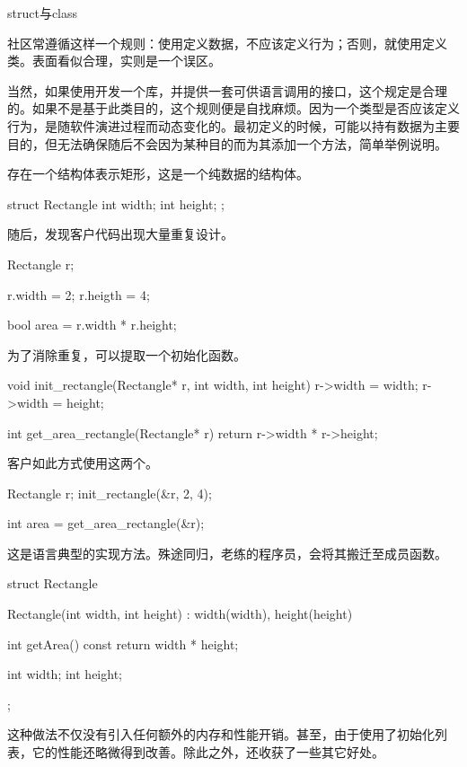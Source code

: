 \begin{content}
\begin{episode}{struct与class}
\begin{content}
社区常遵循这样一个规则：使用定义数据，不应该定义行为；否则，就使用定义类。表面看似合理，实则是一个误区。

当然，如果使用\cpp{}开发一个库，并提供一套可供\clang{}语言调用的接口，这个规定是合理的。如果不是基于此类目的，这个规则便是自找麻烦。因为一个类型是否应该定义行为，是随软件演进过程而动态变化的。最初定义的时候，可能以持有数据为主要目的，但无法确保随后不会因为某种目的而为其添加一个方法，简单举例说明。

存在一个结构体表示矩形，这是一个纯数据的结构体。

\begin{c++}
struct Rectangle {
  int width;
  int height;
};
\end{c++}

随后，发现客户代码出现大量重复设计。

\begin{c++}
Rectangle r;

r.width = 2;
r.heigth = 4;

bool area = r.width * r.height;
\end{c++}

为了消除重复，可以提取一个初始化函数。

\begin{c++}
void init_rectangle(Rectangle* r, int width, int height) {
  r->width = width;
  r->width = height;
}

int get_area_rectangle(Rectangle* r) {
  return r->width * r->height;
}
\end{c++}

客户如此方式使用这两个。

\begin{c++}
Rectangle r;
init_rectangle(&r, 2, 4);

int area = get_area_rectangle(&r);
\end{c++}

这是\clang{}语言典型的实现方法。殊途同归，老练的程序员，会将其搬迁至成员函数。

\begin{c++}
struct Rectangle {
  Rectangle(int width, int height) : width(width), height(height) {
  }

  int getArea() const {
    return width * height;
  }

  int width;
  int height;
};
\end{c++}

这种做法不仅没有引入任何额外的内存和性能开销。甚至，由于使用了初始化列表，它的性能还略微得到改善。除此之外，还收获了一些其它好处。


\end{content}
\end{episode}
\end{content}
